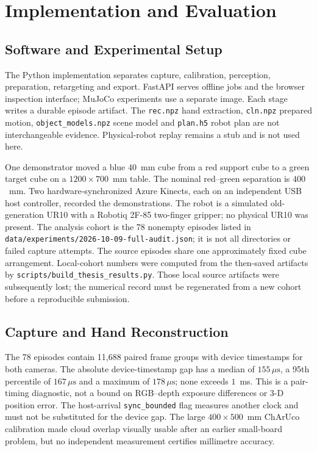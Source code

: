 \chapter{Implementation and Evaluation}
\label{ch:impl}

\section{Software and Experimental Setup}
\label{sec:arch}

The Python implementation separates capture, calibration, perception,
preparation, retargeting and export. FastAPI serves offline jobs and the
browser inspection interface; MuJoCo experiments use a separate image. Each
stage writes a durable episode artifact. The \texttt{rec.npz} hand extraction,
\texttt{cln.npz} prepared motion, \texttt{object\_models.npz} scene model and
\texttt{plan.h5} robot plan are not interchangeable evidence. Physical-robot
replay remains a stub and is not used here.

\label{sec:tasks}
One demonstrator moved a blue $40$~mm cube from a red support cube to a
green target cube on a $1200\times700$~mm table. The nominal red--green
separation is $400$~mm. Two hardware-synchronized Azure Kinects, each on an
independent USB host controller, recorded the demonstrations. The robot is a
simulated old-generation UR10 with a Robotiq 2F-85 two-finger gripper; no
physical UR10 was present. The analysis cohort is the 78 nonempty episodes
listed in \texttt{data/experiments/2026-10-09-full-audit.json}; it is not
all directories or failed capture attempts. The source episodes share one
approximately fixed cube arrangement. Local-cohort numbers were computed
from the then-saved artifacts by \texttt{scripts/build\_thesis\_results.py}.
Those local source artifacts were subsequently lost; the numerical record
must be regenerated from a new cohort before a reproducible submission.

\section{Capture and Hand Reconstruction}
\label{sec:current-results}

The 78 episodes contain 11,688 paired frame groups with device timestamps
for both cameras. The absolute device-timestamp gap has a median of
$155\,\mu\mathrm{s}$, a 95th percentile of $167\,\mu\mathrm{s}$ and a maximum
of $178\,\mu\mathrm{s}$; none exceeds $1$~ms. This is a pair-timing diagnostic,
not a bound on RGB--depth exposure differences or 3-D position error. The
host-arrival \texttt{sync\_bounded} flag measures another clock and must not
be substituted for the device gap. The large $400\times500$~mm ChArUco
calibration made cloud overlap visually usable after an earlier small-board
problem, but no independent measurement certifies millimetre accuracy.

